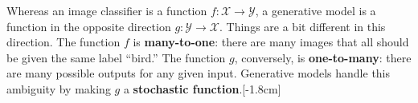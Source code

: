 Whereas an image classifier is a function $f: \mathcal{X} \rightarrow \mathcal{Y}$, a generative model is a function in the opposite direction $g: \mathcal{Y} \rightarrow \mathcal{X}$. Things are a bit different in this direction. The function $f$ is {\bf many-to-one}: there are many images that all should be given the same label ``bird.'' The function $g$, conversely, is {\bf one-to-many}: there are many possible outputs for any given input. Generative models handle this ambiguity by making $g$ a {\bf stochastic function}.[-1.8cm]

